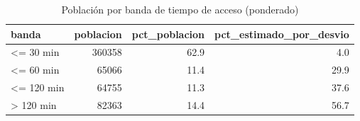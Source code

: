 \begin{table}
\caption{Población por banda de tiempo de acceso (ponderado)}
\label{tab:coverage_bands}
\begin{tabular}{lrrr}
\toprule
banda & poblacion & pct\_poblacion & pct\_estimado\_por\_desvio \\
\midrule
<= 30 min & 360358 & 62.9 & 4.0 \\
<= 60 min & 65066 & 11.4 & 29.9 \\
<= 120 min & 64755 & 11.3 & 37.6 \\
> 120 min & 82363 & 14.4 & 56.7 \\
\bottomrule
\end{tabular}
\end{table}
